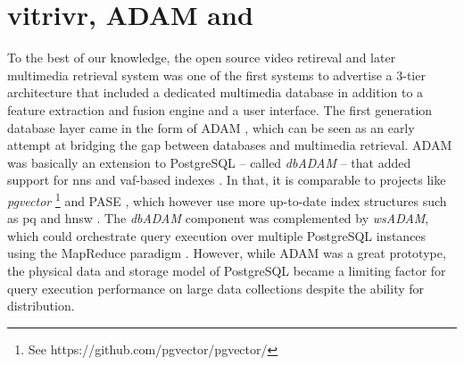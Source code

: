 \section{vitrivr, ADAM and \texorpdfstring{\adampro{}}{ADAMpro}}

To the best of our knowledge, the open source \vitrivr{} video retireval \cite{Rossetto:2016vitrivr} and later multimedia retrieval \cite{Gasser:2019Multimodal} system was one of the first systems to advertise a 3-tier architecture that included a dedicated multimedia database in addition to a feature extraction and fusion engine and a user interface. The first generation database layer came in the form of ADAM \cite{Giangreco:2014Adam}, which can be seen as an early attempt at bridging the gap between databases and multimedia retrieval. ADAM was basically an extension to PostgreSQL -- called \emph{dbADAM} -- that added support for \acrshort{nns} and \acrshort{vaf}-based indexes \cite{Weber:1998Va}. In that, it is comparable to projects like \emph{pgvector} \footnote{See https://github.com/pgvector/pgvector/} and PASE \cite{Yang:2020Pase}, which however use more up-to-date index structures such as \acrshort{pq} \cite{Jegou:2010Product} and \acrshort{hnsw} \cite{Malkov:2018Efficient}. The \emph{dbADAM} component was complemented by \emph{wsADAM}, which could orchestrate query execution over multiple PostgreSQL instances using the MapReduce paradigm \cite{Dean:2008Mapreduce}. However, while ADAM was a great prototype, the physical data and storage model of PostgreSQL became a limiting factor for query execution performance on large data collections despite the ability for distribution.

